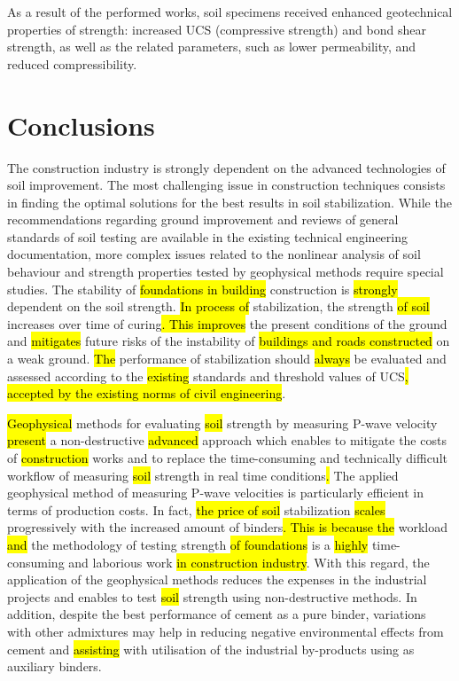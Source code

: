\documentclass[USenglish,twocolumn]{article}
\begin{document}
As a result of the performed works, soil specimens received enhanced geotechnical properties of strength: increased UCS (compressive strength) and bond shear strength, as well as the related parameters, such as lower permeability, and reduced compressibility. 

\section{Conclusions}

The construction industry is strongly dependent on the advanced technologies of soil improvement. The most challenging issue in construction techniques consists in finding the optimal solutions for the best results in soil stabilization. While the recommendations regarding ground improvement and reviews of general standards of soil testing are available in the existing technical engineering documentation, more complex issues related to the nonlinear analysis of soil behaviour and strength properties tested by geophysical methods require special studies.   The stability of \hl{foundations in building }construction is \hl{strongly }dependent on the soil strength. \hl{In process of }stabilization, the strength \hl{of soil }increases over time of curing\hl{. This improves }the present conditions of the ground and \hl{mitigates} future risks of the instability of \hl{buildings and roads constructed }on a weak ground. \hl{The }performance of stabilization should \hl{always }be evaluated and assessed according to the \hl{existing} standards and\hl{ }threshold values of UCS\hl{, accepted by the existing norms of civil engineering}. 

\hl{Geophysical} methods for evaluating \hl{soil }strength by measuring P-wave velocity \hl{present} a non-destructive \hl{advanced }approach which enables to mitigate the costs of \hl{construction }works and to replace the time-consuming and technically difficult workflow of measuring \hl{soil }strength in real time conditions\hl{.}
The applied geophysical method of measuring P-wave velocities is particularly efficient in terms of production costs. In fact,\hl{ the price of soil} stabilization \hl{scales} progressively with the increased amount of binders\hl{. This is because the} workload \hl{and} the methodology of testing\hl{ }strength \hl{of foundations} is a \hl{highly} time-consuming and\hl{ }laborious work \hl{in construction industry}. With this regard, the application of the geophysical methods reduces the expenses in the industrial projects and enables to test \hl{soil }strength using non-destructive methods. In addition, despite the best performance of cement as a pure binder, variations with other admixtures may help in reducing negative environmental effects from cement and \hl{assisting} with utilisation of the industrial by-products using as auxiliary binders.
\end{document}

